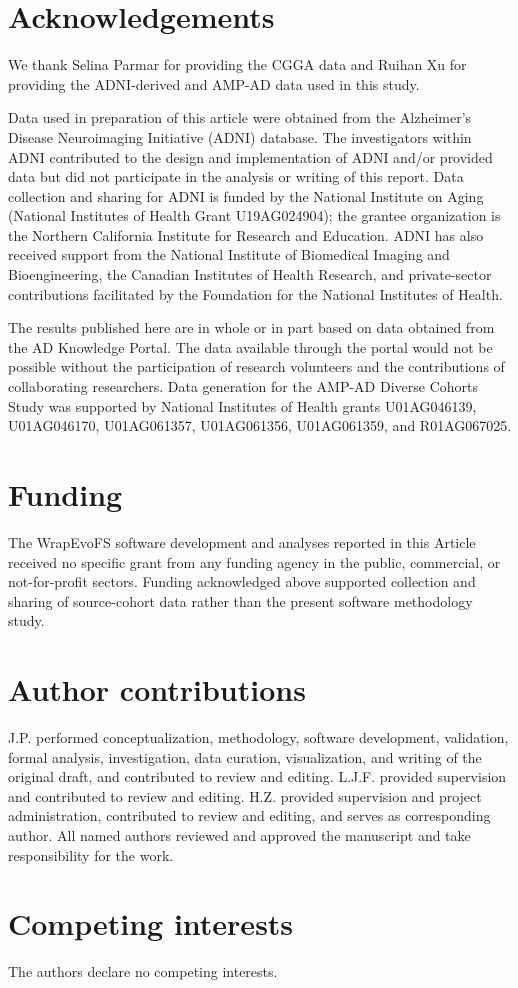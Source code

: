 \FloatBarrier
\section{Acknowledgements}

We thank Selina Parmar for providing the CGGA data and Ruihan Xu for providing the ADNI-derived and AMP-AD data used in this study.

Data used in preparation of this article were obtained from the Alzheimer's Disease Neuroimaging Initiative (ADNI) database. The investigators within ADNI contributed to the design and implementation of ADNI and/or provided data but did not participate in the analysis or writing of this report. Data collection and sharing for ADNI is funded by the National Institute on Aging (National Institutes of Health Grant U19AG024904); the grantee organization is the Northern California Institute for Research and Education. ADNI has also received support from the National Institute of Biomedical Imaging and Bioengineering, the Canadian Institutes of Health Research, and private-sector contributions facilitated by the Foundation for the National Institutes of Health.

The results published here are in whole or in part based on data obtained from the AD Knowledge Portal. The data available through the portal would not be possible without the participation of research volunteers and the contributions of collaborating researchers. Data generation for the AMP-AD Diverse Cohorts Study was supported by National Institutes of Health grants U01AG046139, U01AG046170, U01AG061357, U01AG061356, U01AG061359, and R01AG067025.

\FloatBarrier
\section{Funding}

The WrapEvoFS software development and analyses reported in this Article received no specific grant from any funding agency in the public, commercial, or not-for-profit sectors. Funding acknowledged above supported collection and sharing of source-cohort data rather than the present software methodology study.

\FloatBarrier
\section{Author contributions}

J.P. performed conceptualization, methodology, software development, validation, formal analysis, investigation, data curation, visualization, and writing of the original draft, and contributed to review and editing. L.J.F. provided supervision and contributed to review and editing. H.Z. provided supervision and project administration, contributed to review and editing, and serves as corresponding author. All named authors reviewed and approved the manuscript and take responsibility for the work.

\FloatBarrier
\section{Competing interests}

The authors declare no competing interests.

\FloatBarrier

